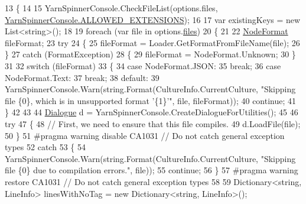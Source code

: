 \begin{DoxyCode}
13         \{
14 
15             YarnSpinnerConsole.CheckFileList(options.files, 
      \hyperlink{a00197_a0979de7ea02c8c0375b8220a12e6575e}{YarnSpinnerConsole.ALLOWED\_EXTENSIONS});
16 
17             var existingKeys = \textcolor{keyword}{new} List<string>();
18 
19             \textcolor{keywordflow}{foreach} (var file \textcolor{keywordflow}{in} options.\hyperlink{a00043_aa93cbb1bc1d5328e0a417012621e92d2}{files})
20             \{
21 
22                 \hyperlink{a00053_ad7ebb46e7309ead8767383a672b3272f}{NodeFormat} fileFormat;
23                 \textcolor{keywordflow}{try}
24                 \{
25                     fileFormat = Loader.GetFormatFromFileName(file);
26                 \}
27                 \textcolor{keywordflow}{catch} (FormatException)
28                 \{
29                     fileFormat = NodeFormat.Unknown;
30                 \}
31 
32                 \textcolor{keywordflow}{switch} (fileFormat)
33                 \{
34                     \textcolor{keywordflow}{case} NodeFormat.JSON:
35                         \textcolor{keywordflow}{break};
36                     \textcolor{keywordflow}{case} NodeFormat.Text:
37                         \textcolor{keywordflow}{break};
38                     \textcolor{keywordflow}{default}:
39                         YarnSpinnerConsole.Warn(string.Format(CultureInfo.CurrentCulture, \textcolor{stringliteral}{"Skipping file
       \{0\}, which is in unsupported format '\{1\}'"}, file, fileFormat));
40                         \textcolor{keywordflow}{continue};
41                 \}
42 
43 
44                 \hyperlink{a00094}{Dialogue} d = YarnSpinnerConsole.CreateDialogueForUtilities();
45 
46                 \textcolor{keywordflow}{try}
47                 \{
48                     \textcolor{comment}{// First, we need to ensure that this file compiles.}
49                     d.LoadFile(file);
50                 \}
51 \textcolor{preprocessor}{#pragma warning disable CA1031 // Do not catch general exception types}
52 \textcolor{preprocessor}{}                \textcolor{keywordflow}{catch}
53                 \{
54                     YarnSpinnerConsole.Warn(string.Format(CultureInfo.CurrentCulture, \textcolor{stringliteral}{"Skipping file \{0\}
       due to compilation errors."}, file));
55                     \textcolor{keywordflow}{continue};
56                 \}
57 \textcolor{preprocessor}{#pragma warning restore CA1031 // Do not catch general exception types}
58 \textcolor{preprocessor}{}
59                 Dictionary<string, LineInfo> linesWithNoTag = \textcolor{keyword}{new} Dictionary<string, LineInfo>();

\end{DoxyCode}
